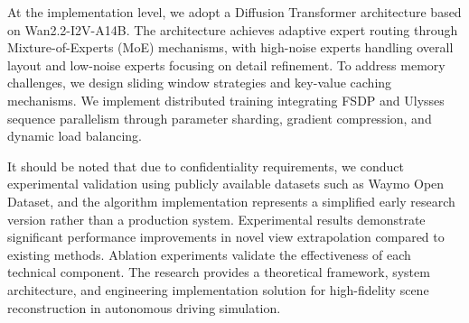 \begin{abstract*}
  At the implementation level, we adopt a Diffusion Transformer architecture based on Wan2.2-I2V-A14B. The architecture achieves adaptive expert routing through Mixture-of-Experts (MoE) mechanisms, with high-noise experts handling overall layout and low-noise experts focusing on detail refinement. To address memory challenges, we design sliding window strategies and key-value caching mechanisms. We implement distributed training integrating FSDP and Ulysses sequence parallelism through parameter sharding, gradient compression, and dynamic load balancing.

  It should be noted that due to confidentiality requirements, we conduct experimental validation using publicly available datasets such as Waymo Open Dataset, and the algorithm implementation represents a simplified early research version rather than a production system. Experimental results demonstrate significant performance improvements in novel view extrapolation compared to existing methods. Ablation experiments validate the effectiveness of each technical component. The research provides a theoretical framework, system architecture, and engineering implementation solution for high-fidelity scene reconstruction in autonomous driving simulation.

\end{abstract*}
